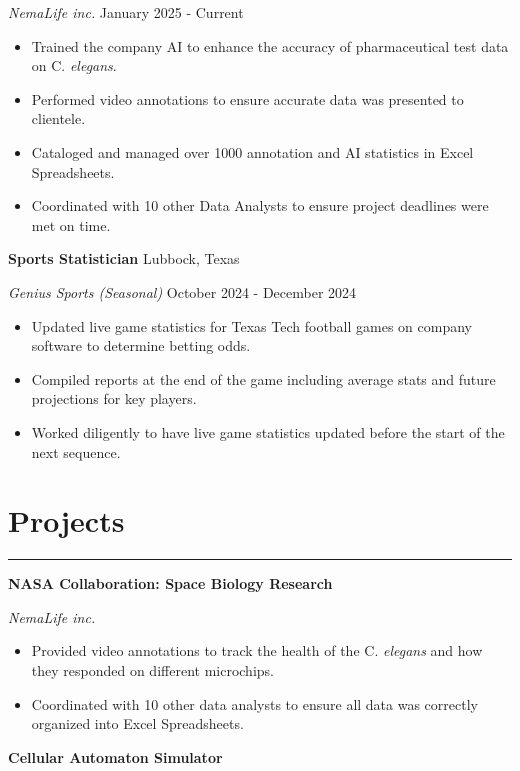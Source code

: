\documentclass[a4paper,11pt]{article}
\begin{document}
\textit{NemaLife inc.} \hfill January 2025 - Current
\vspace{-0.8em}
\begin{itemize}
    \item Trained the company AI to enhance the accuracy of pharmaceutical test data on C. \textit{elegans}.
    \vspace{-0.8em}
    \item Performed video annotations to ensure accurate data was presented to clientele.
    \vspace{-0.8em}
    \item Cataloged and managed over 1000 annotation and AI statistics in Excel Spreadsheets.
    \vspace{-0.8em}
    \item Coordinated with 10 other Data Analysts to ensure project deadlines were met on time. 
\end{itemize}
\vspace{-0.8em}
\textbf{Sports Statistician} \hfill Lubbock, Texas

\textit{Genius Sports (Seasonal)} \hfill October 2024 - December 2024
\vspace{-0.8em}
\begin{itemize}
    \item Updated live game statistics for Texas Tech football games on company software to determine betting odds.
    \vspace{-0.8em}
    \item Compiled reports at the end of the game including average stats and future projections for key players.
    \vspace{-0.8em}
    \item Worked diligently to have live game statistics updated before the start of the next sequence.
\end{itemize}
\vspace{-0.5em}
\vspace{-0.5em}
\section*{Projects}
\vspace{-0.8em}
\rule{\linewidth}{2pt}
\textbf{NASA Collaboration: Space Biology Research}

\textit{NemaLife inc.}
 \vspace{-0.8em}
\begin{itemize}
    \item Provided video annotations to track the health of the C. \textit{elegans} and how they responded on different microchips.
     \vspace{-0.8em}
    \item Coordinated with 10 other data analysts to ensure all data was correctly organized into Excel Spreadsheets.
\end{itemize}
 \vspace{-0.8em}
 \textbf{Cellular Automaton Simulator}
 
\end{document}
